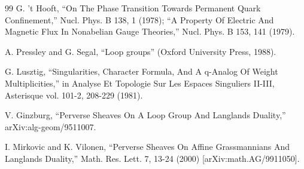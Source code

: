 \documentclass[11pt,a4paper,UTF8]{ctexart}
\begin{document}
\begin{thebibliography}{99}
G. 't Hooft, ``On The Phase Transition Towards Permanent Quark Confinement,'' Nucl. Phys. B 138, 1 (1978); ``A Property Of Electric And Magnetic Flux In Nonabelian Gauge Theories,'' Nucl. Phys. B 153, 141 (1979).

A. Pressley and G. Segal, ``Loop groups'' (Oxford University Press, 1988).

G. Lusztig, ``Singularities, Character Formula, And A q-Analog Of Weight Multiplicities,'' in Analyse Et Topologie Sur Les Espaces Singuliers II-III, Asterisque vol. 101-2, 208-229 (1981).


V. Ginzburg, ``Perverse Sheaves On A Loop Group And Langlands Duality,'' arXiv:alg-geom/9511007.

I. Mirkovic and K. Vilonen, ``Perverse Sheaves On Affine Grassmannians And Langlands Duality,'' Math. Res. Lett. 7, 13-24 (2000) [arXiv:math.AG/9911050].

\end{thebibliography}
\end{document}
